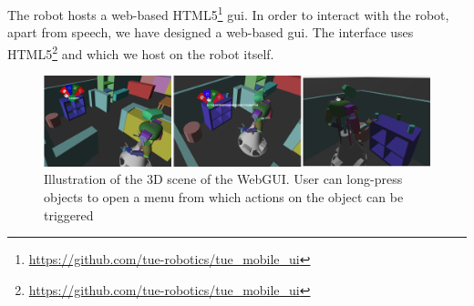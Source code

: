\label{ssec:webgui}
The robot hosts a web-based HTML5\footnote{\url{https://github.com/tue-robotics/tue_mobile_ui}} \gls{gui}. In order to interact with the robot, apart from speech, we have designed a web-based \gls{gui}. The interface uses HTML5\footnote{\url{https://github.com/tue-robotics/tue_mobile_ui}} and which we host on the robot itself.

\begin{figure}[H]
	\includegraphics[width=\linewidth]{Figures/gui_actions}
	\caption{
		Illustration of the 3D scene of the WebGUI.
		User can long-press objects to open a menu from which actions on the object can be triggered
		}
	\label{fig:gui_actions}
\end{figure}

